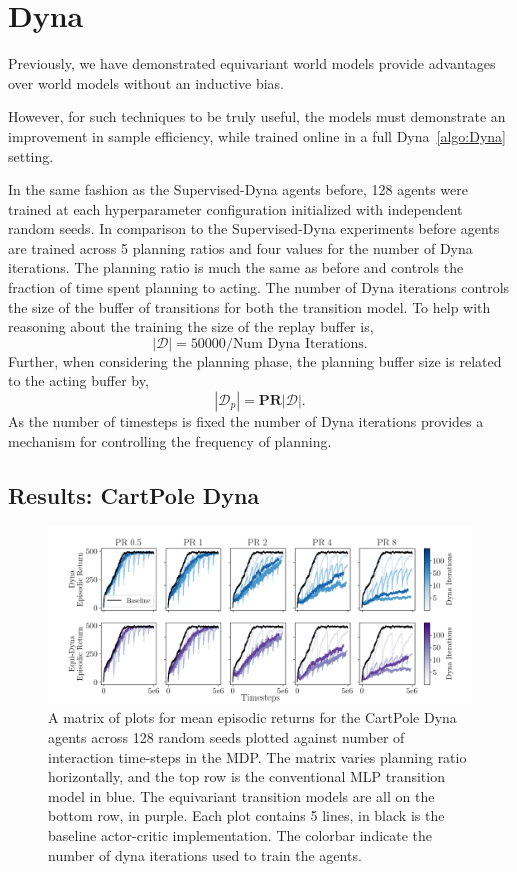 \section{Dyna}\label{sec:Dyna_experiment}
Previously, we have demonstrated equivariant world models provide advantages over world models without an inductive bias.

However, for such techniques to be truly useful, the models must demonstrate an improvement in sample efficiency, while trained online in a full Dyna~\ref{algo:Dyna} setting.

In the same fashion as the Supervised-Dyna agents before, 128 agents were trained at each hyperparameter configuration initialized with independent random seeds. In comparison to the Supervised-Dyna experiments before agents are trained across 5 planning ratios and four values for the number of Dyna iterations. The planning ratio is much the same as before and controls the fraction of time spent planning to acting. The number of Dyna iterations controls the size of the buffer of transitions for both the transition model. To help with reasoning about the training the size of the replay buffer is,
\begin{equation}
	|\mathcal{D}| = 50000/\text{Num Dyna Iterations}.
\end{equation}
Further, when considering the planning phase, the planning buffer size is related to the acting buffer by,
\begin{equation}
	|\mathcal{D}_p| = \textbf{PR}|\mathcal{D}|.
\end{equation}
As the number of timesteps is fixed the number of Dyna iterations provides a mechanism for controlling the frequency of planning.
\subsection{Results: CartPole Dyna}
\begin{figure}[h!]
	\centering
	\includegraphics[width=\textwidth]{Figures/dyna_sweep_cp.png}
	\caption{A matrix of plots for mean episodic returns for the CartPole Dyna agents across 128 random seeds
		plotted against number of interaction time-steps in the MDP. The matrix varies planning ratio horizontally, and the top row is the conventional MLP transition model in blue. The equivariant transition models are all on the bottom row, in purple. Each plot contains 5 lines, in black is the baseline actor-critic implementation. The colorbar indicate the number of dyna iterations used to train the agents.}
	\label{fig:cp_dyna}
\end{figure}


